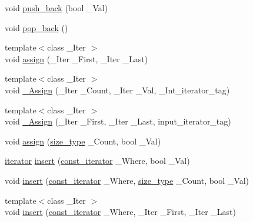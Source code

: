 \begin{DoxyCompactItemize}
\item 
void \hyperlink{classvector_3_01___bool_00_01___alloc_01_4_a51a8feb75ebb3f949e5dde1c68ac9087}{push\+\_\+back} (bool \+\_\+\+Val)
\item 
void \hyperlink{classvector_3_01___bool_00_01___alloc_01_4_a1b4db666e591e12af3411573301564cc}{pop\+\_\+back} ()
\item 
{\footnotesize template$<$class \+\_\+\+Iter $>$ }\\void \hyperlink{classvector_3_01___bool_00_01___alloc_01_4_a517c1fadf919ec08fea26b4361773e31}{assign} (\+\_\+\+Iter \+\_\+\+First, \+\_\+\+Iter \+\_\+\+Last)
\item 
{\footnotesize template$<$class \+\_\+\+Iter $>$ }\\void \hyperlink{classvector_3_01___bool_00_01___alloc_01_4_a10b1e50fcac7063a74a29346039fbacc}{\+\_\+\+Assign} (\+\_\+\+Iter \+\_\+\+Count, \+\_\+\+Iter \+\_\+\+Val, \+\_\+\+Int\+\_\+iterator\+\_\+tag)
\item 
{\footnotesize template$<$class \+\_\+\+Iter $>$ }\\void \hyperlink{classvector_3_01___bool_00_01___alloc_01_4_abe6c2b97561d683aea1bad2af1ca4188}{\+\_\+\+Assign} (\+\_\+\+Iter \+\_\+\+First, \+\_\+\+Iter \+\_\+\+Last, input\+\_\+iterator\+\_\+tag)
\item 
void \hyperlink{classvector_3_01___bool_00_01___alloc_01_4_af56bc3099f1e07525e1941cc65852291}{assign} (\hyperlink{class___vb__val_aae6aa10bcd41d235b46f128df1198612}{size\+\_\+type} \+\_\+\+Count, bool \+\_\+\+Val)
\item 
\hyperlink{classvector_3_01___bool_00_01___alloc_01_4_a151edfa584da275286dbb10b3992940e}{iterator} \hyperlink{classvector_3_01___bool_00_01___alloc_01_4_a2242f90709958c4e134ddb35eafaa1f3}{insert} (\hyperlink{classvector_3_01___bool_00_01___alloc_01_4_a79966c86fbbd4dcb38b01eb352633b7e}{const\+\_\+iterator} \+\_\+\+Where, bool \+\_\+\+Val)
\item 
void \hyperlink{classvector_3_01___bool_00_01___alloc_01_4_a802c95a85e7f32ff18e90b3dcca34ef1}{insert} (\hyperlink{classvector_3_01___bool_00_01___alloc_01_4_a79966c86fbbd4dcb38b01eb352633b7e}{const\+\_\+iterator} \+\_\+\+Where, \hyperlink{class___vb__val_aae6aa10bcd41d235b46f128df1198612}{size\+\_\+type} \+\_\+\+Count, bool \+\_\+\+Val)
\item 
{\footnotesize template$<$class \+\_\+\+Iter $>$ }\\void \hyperlink{classvector_3_01___bool_00_01___alloc_01_4_a4b631226adebbfc2408a790b9fc0afea}{insert} (\hyperlink{classvector_3_01___bool_00_01___alloc_01_4_a79966c86fbbd4dcb38b01eb352633b7e}{const\+\_\+iterator} \+\_\+\+Where, \+\_\+\+Iter \+\_\+\+First, \+\_\+\+Iter \+\_\+\+Last)

\end{DoxyCompactItemize}
